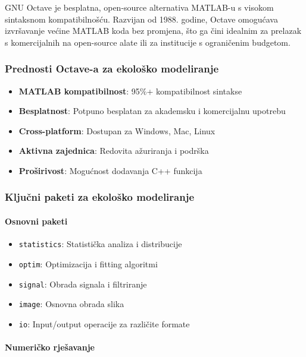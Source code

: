 \documentclass[11pt,oneside]{book}
\begin{document}
GNU Octave je besplatna, open-source alternativa MATLAB-u s visokom sintaksnom kompatibilnošću. Razvijan od 1988. godine, Octave omogućava izvršavanje većine MATLAB koda bez promjena, što ga čini idealnim za prelazak s komercijalnih na open-source alate ili za institucije s ograničenim budgetom.

\subsubsection{Prednosti Octave-a za ekološko modeliranje}

\begin{itemize}
	\item \textbf{MATLAB kompatibilnost}: 95\%+ kompatibilnost sintakse
	\item \textbf{Besplatnost}: Potpuno besplatan za akademsku i komercijalnu upotrebu
	\item \textbf{Cross-platform}: Dostupan za Windows, Mac, Linux
	\item \textbf{Aktivna zajednica}: Redovita ažuriranja i podrška
	\item \textbf{Proširivost}: Mogućnost dodavanja C++ funkcija
\end{itemize}

\subsubsection{Ključni paketi za ekološko modeliranje}

\paragraph{Osnovni paketi}

\begin{itemize}
	\item \texttt{statistics}: Statistička analiza i distribucije
	\item \texttt{optim}: Optimizacija i fitting algoritmi
	\item \texttt{signal}: Obrada signala i filtriranje
	\item \texttt{image}: Osnovna obrada slika
	\item \texttt{io}: Input/output operacije za različite formate
\end{itemize}

\paragraph{Numeričko rješavanje}
\end{document}
